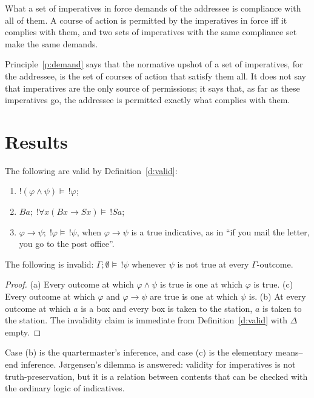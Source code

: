 \documentclass{situationist-preprint}
\begin{document}
\begin{principle}\label{p:demand}
What a set of imperatives in force demands of the addressee is compliance with all of them. A course of action is permitted by the imperatives in force iff it complies with them, and two sets of imperatives with the same compliance set make the same demands.
\end{principle}

Principle~\ref{p:demand} says that the normative upshot of a set of imperatives, for the addressee, is the set of courses of action that satisfy them all. It does not say that imperatives are the only source of permissions; it says that, as far as these imperatives go, the addressee is permitted exactly what complies with them.

\section{Results}

\begin{proposition}\label{p:jorgensen}
The following are valid by Definition~\ref{d:valid}:
\begin{enumerate}[label=(\alph*)]
\item $!(\varphi \wedge \psi) \models\, !\varphi$;
\item $Ba;\; !\forall x(Bx \rightarrow Sx) \models\, !Sa$;
\item $\varphi \rightarrow \psi;\; !\varphi \models\, !\psi$, when $\varphi \rightarrow \psi$ is a true indicative, as in \enquote{if you mail the letter, you go to the post office}.
\end{enumerate}
The following is invalid: $\Gamma; \emptyset \models\, !\psi$ whenever $\psi$ is not true at every $\Gamma$-outcome.
\end{proposition}

\begin{proof}
(a) Every outcome at which $\varphi \wedge \psi$ is true is one at which $\varphi$ is true. (c) Every outcome at which $\varphi$ and $\varphi \rightarrow \psi$ are true is one at which $\psi$ is. (b) At every outcome at which $a$ is a box and every box is taken to the station, $a$ is taken to the station. The invalidity claim is immediate from Definition~\ref{d:valid} with $\Delta$ empty.
\end{proof}

Case (b) is the quartermaster's inference, and case (c) is the elementary means--end inference. Jørgensen's dilemma is answered: validity for imperatives is not truth-preservation, but it is a relation between contents that can be checked with the ordinary logic of indicatives.
\end{document}
